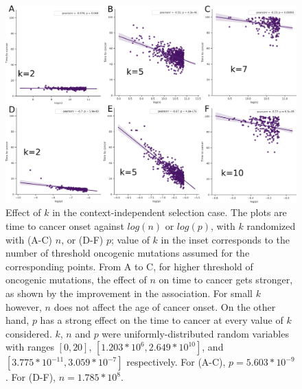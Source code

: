 \documentclass[9pt,twocolumn,twoside]{pnas-new}
\begin{document}
\begin{figure}[tbhp]
	\centering
	\includegraphics[width=.8\linewidth]{fig5.png}
	\caption{Effect of $k$ in the context-independent selection case. The plots are time to cancer onset against $log(n)$ or $log(p)$, with $k$ randomized with (A-C) $n$, or (D-F) $p$; value of $k$ in the inset corresponds to the number of threshold oncogenic mutations assumed for the corresponding points. From A to C, for higher threshold of oncogenic mutations, the effect of $n$ on time to cancer gets stronger, as shown by the improvement in the association. For small $k$ however, $n$ does not affect the age of cancer onset. On the other hand, $p$ has a strong effect on the time to cancer at every value of $k$ considered. $k$, $n$ and $p$ were uniformly-distributed random variables with ranges $[0, 20]$, $[1.203*10^{6}, 2.649*10^{10}]$, and $[3.775*10^{-11}, 3.059*10^{-7}]$ respectively. For (A-C), $p=5.603*10^{-9}$. For (D-F), $n=1.785*10^{8}$.}
	\label{fig5}
\end{figure}
\end{document}
